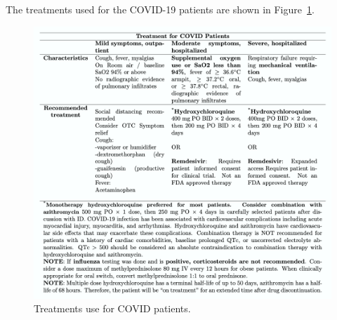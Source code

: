 \documentclass[Minh_PhD_thesis.tex]{subfiles}
\begin{document}
The treatments used for the COVID-19 patients are shown in Figure~\ref{Supp:TreatmentCovidPatient}.



\begin{figure}
\centering
	\includegraphics[width=0.9\linewidth]{../Figures/TreatmentCOVIDPatients.png}
    \caption{ Treatments use for COVID patients.}
        \label{Supp:TreatmentCovidPatient}
\end{figure}
\end{document}
